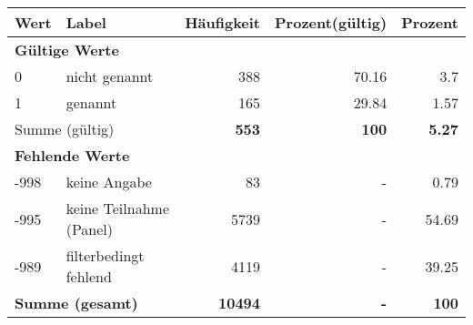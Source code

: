      \begin{longtable}{lXrrr}
     \toprule
     \textbf{Wert} & \textbf{Label} & \textbf{Häufigkeit} & \textbf{Prozent(gültig)} & \textbf{Prozent} \\
     \endhead
     \midrule
     \multicolumn{5}{l}{\textbf{Gültige Werte}}\\

     0 &
     \multicolumn{1}{X}{ nicht genannt   } &


       \num{388} &
       \num[round-mode=places,round-precision=2]{70,16} &
         \num[round-mode=places,round-precision=2]{3,7} \\

     1 &
     \multicolumn{1}{X}{ genannt   } &


       \num{165} &
       \num[round-mode=places,round-precision=2]{29,84} &
         \num[round-mode=places,round-precision=2]{1,57} \\
     \midrule
     \multicolumn{2}{l}{Summe (gültig)} &
       \textbf{\num{553}} &
     \textbf{100} &
       \textbf{\num[round-mode=places,round-precision=2]{5,27}} \\
     \multicolumn{5}{l}{\textbf{Fehlende Werte}}\\
       -998 &
       keine Angabe &
         \num{83} &
        - &
         \num[round-mode=places,round-precision=2]{0,79} \\
       -995 &
       keine Teilnahme (Panel) &
         \num{5739} &
        - &
         \num[round-mode=places,round-precision=2]{54,69} \\
       -989 &
       filterbedingt fehlend &
         \num{4119} &
        - &
         \num[round-mode=places,round-precision=2]{39,25} \\
     \midrule
     \multicolumn{2}{l}{\textbf{Summe (gesamt)}} &
          \textbf{\num{10494}} &
        \textbf{-} &
        \textbf{100} \\
     \bottomrule
     \end{longtable}
     
